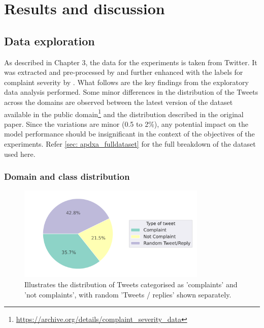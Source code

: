 \chapter{Results and discussion}

\section{Data exploration}
As described in Chapter 3, the data for the experiments is taken from Twitter. It was extracted and pre-processed by \cite{preotiuc-pietro_automatically_2019} and further enhanced with the labels for complaint severity by \cite{jinModelingSeverityComplaints2021}. What follows are the key findings from the exploratory data analysis performed. Some minor differences in the distribution of the Tweets across the domains are observed between the latest version of the dataset available in the public domain\footnote{\url{https://archive.org/details/complaint_severity_data}} and the distribution described in the original paper. Since the variations are minor (0.5 to 2\%), any potential impact on the model performance should be insignificant in the context of the objectives of the experiments. Refer \ref{sec: apdxa_fulldataset} for the full breakdown of the dataset used here.

\subsection{Domain and class distribution}
\begin{figure}[htb]
    \centering
    \captionsetup{font=small}
    \includegraphics[width=9cm]{figures/compl_non_random_dist.pdf}
    \vspace*{-3mm}
    \caption{Illustrates the distribution of Tweets categorised as 'complaints' and 'not complaints', with random 'Tweets / replies' shown separately.}
    \label{fig: compl_non_random_dist}
\end{figure}


